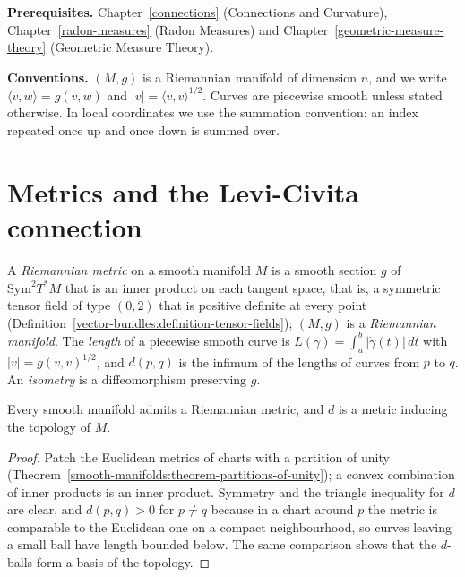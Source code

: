 \noindent\textbf{Prerequisites.} Chapter~\ref{connections} (Connections and Curvature), Chapter~\ref{radon-measures} (Radon Measures) and Chapter~\ref{geometric-measure-theory} (Geometric Measure Theory).

\noindent\textbf{Conventions.} $(M, g)$ is a Riemannian manifold of dimension $n$, and we write $\langle v, w\rangle = g(v, w)$ and $|v| = \langle v, v\rangle^{1/2}$. Curves are piecewise smooth unless stated otherwise. In local
coordinates we use the summation convention: an index repeated once up and once down is summed over.

\section{Metrics and the Levi-Civita connection}\label{riemannian-geometry:section-levi-civita}

\begin{definition}\label{riemannian-geometry:definition-metric}
A \emph{Riemannian metric} on a smooth manifold $M$ is a smooth section $g$ of $\mathrm{Sym}^2T^*M$ that is an inner product on each tangent space, that is, a symmetric tensor field
of type $(0,2)$ that is positive definite at every point (Definition~\ref{vector-bundles:definition-tensor-fields}); $(M, g)$ is a \emph{Riemannian manifold}. The
\emph{length} of a piecewise smooth curve is $L(\gamma) = \int_a^b|\dot\gamma(t)|\,dt$ with $|v| = g(v, v)^{1/2}$, and $d(p, q)$ is the infimum of the lengths of curves from $p$ to $q$. An \emph{isometry} is a
diffeomorphism preserving $g$.
\end{definition}

\begin{proposition}\label{riemannian-geometry:proposition-metric-exists}
Every smooth manifold admits a Riemannian metric, and $d$ is a metric inducing the topology of $M$.
\end{proposition}

\begin{proof}
Patch the Euclidean metrics of charts with a partition of unity (Theorem~\ref{smooth-manifolds:theorem-partitions-of-unity}); a convex combination of inner products is an inner product. Symmetry and the
triangle inequality for $d$ are clear, and $d(p, q) > 0$ for $p \neq q$ because in a chart around $p$ the metric is comparable to the Euclidean one on a compact neighbourhood, so curves leaving a small ball
have length bounded below. The same comparison shows that the $d$-balls form a basis of the topology.
\end{proof}

